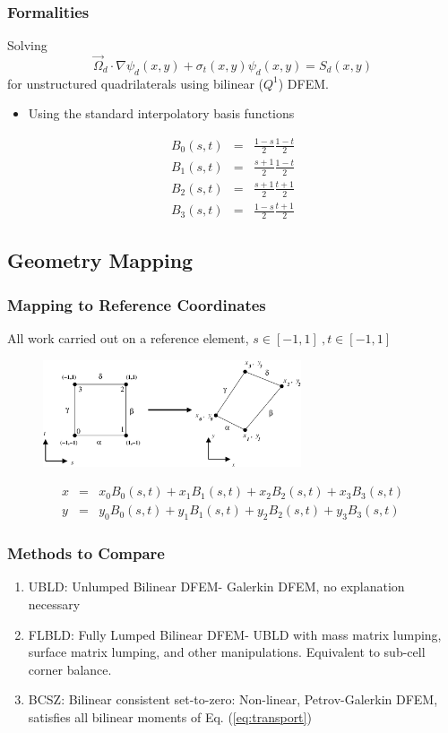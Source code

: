 \documentclass{beamer}
\newcommand{\benum}{\begin{equation}}   %
\newcommand{\eenum}{\end{equation}}
\newcommand{\bea}{\begin{eqnarray*}}  %
\newcommand{\eea}{\end{eqnarray*}}
\newcommand{\beanum}{\begin{eqnarray}}  %
\newcommand{\eeanum}{\end{eqnarray}}
\newcommand{\eqt}[1]{Eq. (\ref{#1})}  %
\newcommand{\B}[1]{\ensuremath{B_{#1} }}			%
\newcommand{\omg}{\ensuremath{\vec{\Omega}}}
\begin{document}
\begin{frame}
\frametitle{Formalities}
Solving
\benum
\omg_d \cdot \nabla \psi_d(x,y) + \sigma_t(x,y) \psi_d(x,y) = S_d(x,y)
\label{eq:transport}
\eenum
for unstructured quadrilaterals using bilinear ($Q^1$) DFEM.

\begin{itemize}
\item Using the standard interpolatory basis functions
\end{itemize}
\bea
\B{0}(s,t) &=& \frac{1-s}{2}\frac{1-t}{2} \\
\B{1}(s,t) &=& \frac{s+1}{2}\frac{1-t}{2} \\
\B{2}(s,t) &=& \frac{s+1}{2}\frac{t+1}{2} \\
\B{3}(s,t) &=& \frac{1-s}{2}\frac{t+1}{2}  
\eea

\end{frame}


\subsection{Geometry Mapping}
\begin{frame}
\frametitle{Mapping to Reference Coordinates}
All work carried out on a reference element, $s\in[-1,1]~,t\in[-1,1]$
\begin{figure}[t]
\centering
\includegraphics[width=3in]{mc_coord.pdf}
\end{figure}
%
%
\beanum
x &=& x_0 \B{0}(s,t) + x_1 \B{1}(s,t) + x_2 \B{2}(s,t) + x_3 \B{3}(s,t) \\
y &=&  y_0 \B{0}(s,t) + y_1 \B{1}(s,t) + y_2 \B{2}(s,t) + y_3 \B{3}(s,t) 
\eeanum
\end{frame}

\begin{frame}
\frametitle{Methods to Compare}
\begin{enumerate}
\item UBLD: Unlumped Bilinear DFEM- Galerkin DFEM, no explanation necessary \vspace{0.2in}
\item FLBLD: Fully Lumped Bilinear DFEM- UBLD with mass matrix lumping, surface matrix lumping, and other manipulations.  Equivalent to sub-cell corner balance. \vspace{0.2in}
\item BCSZ: Bilinear consistent set-to-zero: Non-linear, Petrov-Galerkin DFEM, satisfies all bilinear moments of \eqt{eq:transport} 
\end{enumerate}

\end{frame}
\end{document}
